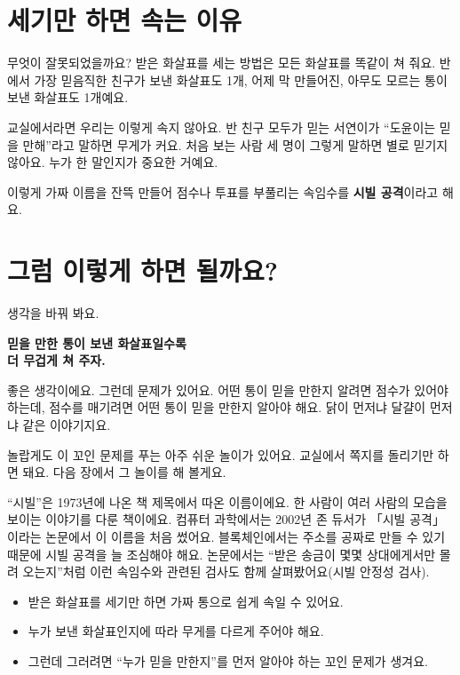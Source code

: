 \section{세기만 하면 속는 이유}

무엇이 잘못되었을까요?
받은 화살표를 세는 방법은 모든 화살표를 똑같이 쳐 줘요.
반에서 가장 믿음직한 친구가 보낸 화살표도 1개,
어제 막 만들어진, 아무도 모르는 통이 보낸 화살표도 1개예요.

교실에서라면 우리는 이렇게 속지 않아요.
반 친구 모두가 믿는 서연이가 “도윤이는 믿을 만해”라고 말하면 무게가 커요.
처음 보는 사람 세 명이 그렇게 말하면 별로 믿기지 않아요.
누가 한 말인지가 중요한 거예요.

이렇게 가짜 이름을 잔뜩 만들어 점수나 투표를 부풀리는 속임수를 \textbf{시빌 공격}이라고 해요.

\section{그럼 이렇게 하면 될까요?}

생각을 바꿔 봐요.

\begin{center}
\begin{tcolorbox}[colback=white, colframe=inkblue, boxrule=0.8pt, arc=2mm, width=0.9\linewidth, halign=center]
\titlefont\bfseries 믿을 만한 통이 보낸 화살표일수록\\더 무겁게 쳐 주자.
\end{tcolorbox}
\end{center}

좋은 생각이에요.
그런데 문제가 있어요.
어떤 통이 믿을 만한지 알려면 점수가 있어야 하는데,
점수를 매기려면 어떤 통이 믿을 만한지 알아야 해요.
닭이 먼저냐 달걀이 먼저냐 같은 이야기지요.

놀랍게도 이 꼬인 문제를 푸는 아주 쉬운 놀이가 있어요.
교실에서 쪽지를 돌리기만 하면 돼요.
다음 장에서 그 놀이를 해 볼게요.

\begin{deeper}[시빌이라는 이름]
“시빌”은 1973년에 나온 책 제목에서 따온 이름이에요.
한 사람이 여러 사람의 모습을 보이는 이야기를 다룬 책이에요.
컴퓨터 과학에서는 2002년 존 듀서가 「시빌 공격」이라는 논문에서 이 이름을 처음 썼어요.
블록체인에서는 주소를 공짜로 만들 수 있기 때문에 시빌 공격을 늘 조심해야 해요.
논문에서는 “받은 송금이 몇몇 상대에게서만 몰려 오는지”처럼 이런 속임수와 관련된 검사도 함께 살펴봤어요(시빌 안정성 검사).
\end{deeper}

\begin{learned}
\begin{itemize}
\item 받은 화살표를 세기만 하면 가짜 통으로 쉽게 속일 수 있어요.
\item 누가 보낸 화살표인지에 따라 무게를 다르게 주어야 해요.
\item 그런데 그러려면 “누가 믿을 만한지”를 먼저 알아야 하는 꼬인 문제가 생겨요.
\end{itemize}
\end{learned}
